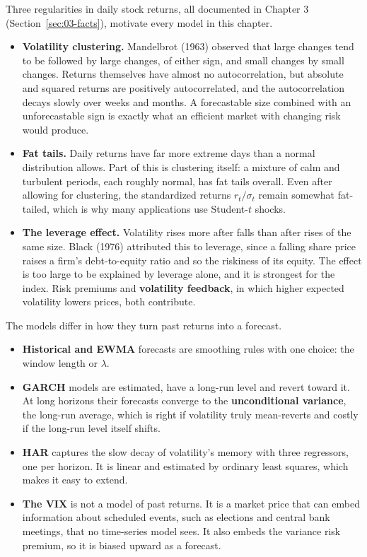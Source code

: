 Three regularities in daily stock returns, all documented in Chapter 3 (Section~\ref{sec:03-facts}), motivate every model in this chapter.

\begin{itemize}
  \item \textbf{Volatility clustering.} Mandelbrot (1963) observed that large changes tend to be followed by large changes, of either sign, and small changes by small changes. Returns themselves have almost no autocorrelation, but absolute and squared returns are positively autocorrelated, and the autocorrelation decays slowly over weeks and months. A forecastable size combined with an unforecastable sign is exactly what an efficient market with changing risk would produce.
  \item \textbf{Fat tails.} Daily returns have far more extreme days than a normal distribution allows. Part of this is clustering itself: a mixture of calm and turbulent periods, each roughly normal, has fat tails overall. Even after allowing for clustering, the standardized returns $r_t / \sigma_t$ remain somewhat fat-tailed, which is why many applications use Student-$t$ shocks.
  \item \textbf{The leverage effect.} Volatility rises more after falls than after rises of the same size. Black (1976) attributed this to leverage, since a falling share price raises a firm's debt-to-equity ratio and so the riskiness of its equity. The effect is too large to be explained by leverage alone, and it is strongest for the index. Risk premiums and \textbf{volatility feedback}, in which higher expected volatility lowers prices, both contribute.
\end{itemize}

The models differ in how they turn past returns into a forecast.

\begin{itemize}
  \item \textbf{Historical and EWMA} forecasts are smoothing rules with one choice: the window length or $\lambda$.
  \item \textbf{GARCH} models are estimated, have a long-run level and revert toward it. At long horizons their forecasts converge to the \textbf{unconditional variance}, the long-run average, which is right if volatility truly mean-reverts and costly if the long-run level itself shifts.
  \item \textbf{HAR} captures the slow decay of volatility's memory with three regressors, one per horizon. It is linear and estimated by ordinary least squares, which makes it easy to extend.
  \item \textbf{The VIX} is not a model of past returns. It is a market price that can embed information about scheduled events, such as elections and central bank meetings, that no time-series model sees. It also embeds the variance risk premium, so it is biased upward as a forecast.
\end{itemize}

